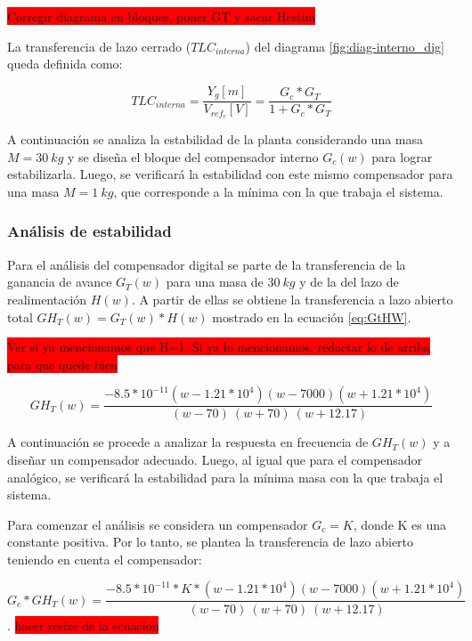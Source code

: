 \colorbox{red}{Corregir diagrama en bloques, poner GT y sacar Hestim}

La transferencia de lazo cerrado ($TLC_{interna}$) del diagrama \ref{fig:diag-interno_dig} queda definida como:

\begin{equation}
	TLC_{interna}=\frac{Y_g[m]}{V_{ref_c}[V]}=\frac{G_c*G_T}{1+G_c*G_T}
\end{equation}

A continuación se analiza la estabilidad de la planta considerando una masa $M=30\:kg$ y se diseña el bloque del compensador interno $G_c(w)$ para lograr estabilizarla. Luego, se verificará la estabilidad con este mismo compensador para una masa $M=1\:kg$, que corresponde a la mínima con la que trabaja el sistema.

\subsubsection{Análisis de estabilidad}

 Para el análisis del compensador digital se parte de la transferencia de la ganancia de avance $G_{T}(w)$ para una masa de $30\:kg$ y de la del lazo de realimentación $H(w)$. A partir de ellas se obtiene la transferencia a lazo abierto total $GH_{T}(w)=G_{T}(w)*H(w)$ mostrado en la ecuación \ref{eq:GtHW}.

\colorbox{red}{Ver si ya mencionamos que H=1. Si ya lo mencionamos, redactar lo de arriba para que quede bien}
 
\begin{equation}
	\label{eq:GtHW}  
	GH_{T}(w)=\frac{-8.5*10^{-11}(w-1.21*10^4)(w-7000)(w+1.21*10^4)}{\ (w-70)\ (w+70)\ (w+12.17)} 
\end{equation} 


 A continuación se procede a analizar la respuesta en frecuencia de $GH_{T}(w)$ y a diseñar un compensador adecuado. Luego, al igual que para el compensador analógico, se verificará la estabilidad para la mínima masa  con la  que trabaja el sistema.
 
Para comenzar el análisis se considera un compensador $G_c=K$, donde K es una constante positiva. Por lo tanto, se plantea la transferencia de lazo abierto teniendo en cuenta el compensador:
 
 \begin{equation} \label{eq_GT3_dig}
 	G_c*GH_T(w)=\frac{-8.5*10^{-11}*K*(w-1.21*10^4)(w-7000)(w+1.21*10^4)}{\ (w-70)\ (w+70)\ (w+12.17)} 
 \end{equation}.
\colorbox{red}{hacer resize de la ecuacion}

